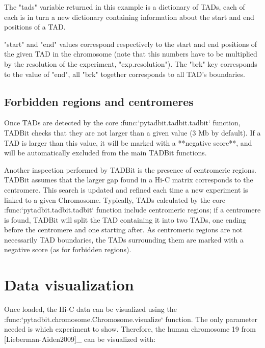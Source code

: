 \documentclass[letterpaper,10pt,english]{/usr/local/lib/python2.7/dist-packages/Sphinx-1.2b1-py2.7.egg/sphinx/texinputs/sphinxhowto}
\newenvironment{InvisibleVerbatim}
        {\begin{mdframed}[leftmargin=0.1\linewidth,innerleftmargin=3pt,innerrightmargin=3pt, userdefinedwidth=1\linewidth, linewidth=0pt, linecolor=white, usetwoside=false]}
        {\end{mdframed}}
\begin{document}
\begin{InvisibleVerbatim}
            \end{InvisibleVerbatim}
            
        
    

    The "tads" variable returned in this example is a dictionary of TADs,
each of each is in turn a new dictionary containing information about
the start and end positions of a TAD.

"start" and "end" values correspond respectively to the start and end
positions of the given TAD in the chromosome (note that this numbers
have to be multiplied by the resolution of the experiment,
"exp.resolution"). The "brk" key corresponds to the value of "end",
all "brk" together corresponds to all TAD's boundaries.
\subsection{Forbidden regions and centromeres}
    Once TADs are detected by the core :func:`pytadbit.tadbit.tadbit`
function, TADBit checks that they are not
larger than a given value (3 Mb by default). If a TAD is larger than
this value, it will be marked with a
**negative score**, and will be automatically excluded from the main
TADBit functions.

Another inspection performed by TADBit is the presence of centromeric
regions. TADBit assumes that the larger
gap found in a Hi-C matrix corresponds to the centromere. This search
is updated and refined each time a new
experiment is linked to a given Chromosome. Typically, TADs calculated
by the core
:func:`pytadbit.tadbit.tadbit` function include centromeric regions;
if a centromere is found, TADBit will
split the TAD containing it into two TADs, one ending before the
centromere and one starting after. As
centromeric regions are not necessarily TAD boundaries, the TADs
surrounding them are marked with a negative
score (as for forbidden regions).

\section{Data visualization}
    Once loaded, the Hi-C data can be visualized using the
:func:`pytadbit.chromosome.Chromosome.visualize`
function. The only parameter needed is which experiment to show.
Therefore, the human chromosome 19 from [Lieberman-Aiden2009]_ can be
visualized with:


\end{document}
